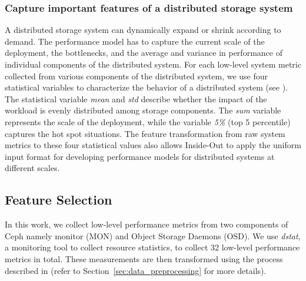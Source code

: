 \subsubsection*{Capture important features of a distributed storage system}
%
A distributed storage system can dynamically expand or shrink
according to demand.
The performance model has to capture the current 
scale of the deployment, the bottlenecks, and the average and variance in performance
of individual components of the distributed system. For each low-level system metric collected from 
various components of the distributed system, we use four statistical variables to characterize the behavior of a distributed system (see \myfigure{\ref{fig:feature_types}}). 
The statistical variable \textit{mean} and \textit{std} describe whether the impact of the workload is evenly distributed among 
storage components. The \textit{sum} variable represents the scale of the deployment, while the variable \textit{5\%} (top 5 percentile) captures the hot spot situations. 
The feature transformation from raw system metrics to these four statistical values also allows Inside-Out to apply 
the uniform input format for developing performance models for distributed systems at different scales.

\subsection{Feature Selection}
\label{sec:non-deterministic}

In this work, we collect low-level performance metrics
from two components of Ceph
namely monitor (MON) and Object Storage Daemons (OSD).
We use \emph{dstat}, a monitoring tool to collect resource statistics,
to collect 32 low-level performance metrics in total.
These measurements are then transformed using the process described in \myfigure{\ref{fig:feature_types}} (refer to Section~\ref{sec:data_preprocessing} for more details).


